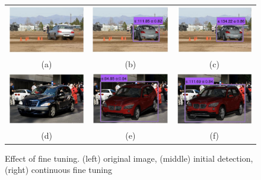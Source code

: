 \documentclass[10pt,twocolumn,letterpaper]{article}
\begin{document}
\begin{figure}[t]
 \begin{center}
    \setlength\tabcolsep{0pt}
    \begin{tabular}{ccc}
   \includegraphics[width=0.33\linewidth]{tuning/1.png} &
   \includegraphics[width=0.33\linewidth]{tuning/2.png} &
   \includegraphics[width=0.33\linewidth]{tuning/3.png} \\[-5pt]
   (a) & (b) & (c)\\
   \includegraphics[width=0.33\linewidth]{tuning/4.png} &
   \includegraphics[width=0.33\linewidth]{tuning/5.png} &
   \includegraphics[width=0.33\linewidth]{tuning/6.png} \\[-5pt]
   (d) & (e) & (f)\\
   \end{tabular}
 \end{center}
 \caption{Effect of fine tuning. (left) original image, (middle) initial detection, (right) continuous fine tuning}
 \label{fig:tuning}
\end{figure}
 
\end{document}
